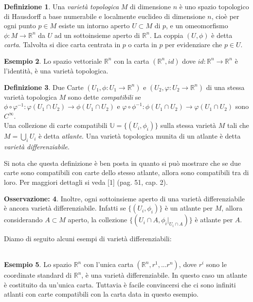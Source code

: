 \documentclass[12pt,a4paper]{report}
\theoremstyle{definition}
\newtheorem{Def}{Definizione}[chapter]
\theoremstyle{definition}
\newtheorem{Ex}[Def]{Esempio}
\theoremstyle{definition}
\theoremstyle{definition}
\newtheorem{Obs}[Def]{Osservazione:}
\begin{document}
\begin{Def}
	Una \textit{varietà topologica} $M$ di dimensione $n$ è uno spazio topologico di Hausdorff a base numerabile e localmente euclideo di dimensione $n$, cioè per ogni punto $p\in M$ esiste un intorno aperto $U\subset M$ di $p$, e un omeomorfismo $\phi:M\rightarrow\mathbb{R}^n$ da $U$ ad un sottoinsieme aperto di $\mathbb{R}^n$. La coppia $(U,\phi)$ è detta \textit{carta}. Talvolta si dice carta centrata in $p$ o carta in $p$ per evidenziare che $p\in U$. 
\end{Def}
\begin{Ex}
	Lo spazio vettoriale $\mathbb{R}^n$ con la carta $(\mathbb{R}^n, id)$ dove $id:\mathbb{R}^n\rightarrow \mathbb{R}^n$ è l'identità, è una varietà topologica. 
\end{Ex}
\begin{Def}
	Due Carte $(U_1,\phi:U_1\rightarrow\mathbb{R}^n)$ e $(U_2,\varphi:U_2\rightarrow\mathbb{R}^n)$ di una stessa varietà topologica $M$ sono dette \textit{compatibili} se
	$\phi\circ\varphi^{-1}:\varphi(U_1\cap U_2)\rightarrow \phi(U_1\cap U_2)$ e $\varphi\circ\phi^{-1}:\phi(U_1\cap U_2)\rightarrow \varphi(U_1\cap U_2)$ sono $C^\infty$.\\
	Una collezione di carte compatibili $\mathbb{U}=\{(U_i,\phi_{i})\}$ sulla stessa varietà $M$ tali che $M=\bigcup_i U_i$ è detta \textit{atlante}. Una varietà topologica munita di un atlante è detta \textit{varietà differenziabile}.
\end{Def}
Si nota che questa definizione è ben posta in quanto si può mostrare che se due carte sono compatibili con carte dello stesso atlante, allora sono compatibili tra di loro. Per maggiori dettagli si veda [1] (pag. 51, cap. 2).
\begin{Obs}\label{Obs:1.1.1}
Inoltre, ogni sottoinsieme aperto di una varietà differenziabile è ancora varietà differenziabile. Infatti se $\{(U_i,\phi_i)\}$ è un atlante per $M$, allora considerando $A\subset M$ aperto, la collezione $\{(U_i\cap A,\phi_i|_{U_i\cap A})\}$ è atlante per $A$.
\end{Obs}
Diamo di seguito alcuni esempi di varietà differenziabili:\\
\\
\begin{Ex}
	Lo spazio $\mathbb{R}^n$ con l'unica carta $(\mathbb{R}^n,r^1,...r^n)$, dove $r^i$ sono le coordinate standard di $\mathbb{R}^n$, è una varietà differenziabile. In questo caso un atlante è costituito da un'unica carta. Tuttavia è facile convincersi che ci sono infiniti atlanti con carte compatibili con la carta data in questo esempio.
\end{Ex}
\end{document}
